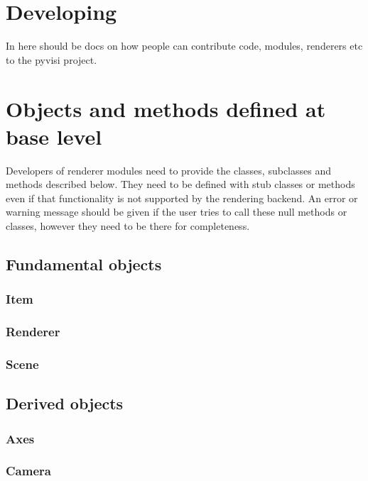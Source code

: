 
\chapter{Developing \pyvisi}
\label{chap:developingPyvisi}

In here should be docs on how people can contribute code, modules, renderers
etc to the pyvisi project.


\chapter{Objects and methods defined at base level}

Developers of \pyvisi renderer modules need to provide the classes, subclasses
and methods described below.  They need to be defined with stub classes or
methods even if that functionality is not supported by the rendering backend.
An error or warning message should be given if the user tries to call these
null methods or classes, however they need to be there for completeness.

\section{Fundamental objects}

\subsection{Item}

\subsection{Renderer}

\subsection{Scene}

\section{Derived objects}

\subsection{Axes}

\subsection{Camera}

